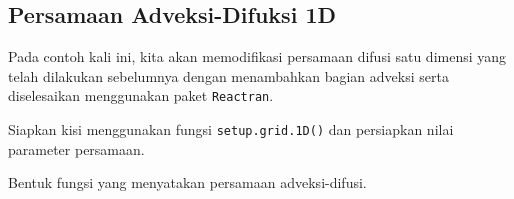 \documentclass[
]{book}
\newenvironment{Shaded}{\begin{snugshade}}{\end{snugshade}}
\newcommand{\AttributeTok}[1]{\textcolor[rgb]{0.13,0.29,0.53}{#1}}
\newcommand{\CommentTok}[1]{\textcolor[rgb]{0.56,0.35,0.01}{\textit{#1}}}
\newcommand{\ControlFlowTok}[1]{\textcolor[rgb]{0.13,0.29,0.53}{\textbf{#1}}}
\newcommand{\DecValTok}[1]{\textcolor[rgb]{0.00,0.00,0.81}{#1}}
\newcommand{\FloatTok}[1]{\textcolor[rgb]{0.00,0.00,0.81}{#1}}
\newcommand{\FunctionTok}[1]{\textcolor[rgb]{0.13,0.29,0.53}{\textbf{#1}}}
\newcommand{\NormalTok}[1]{#1}
\newcommand{\OtherTok}[1]{\textcolor[rgb]{0.56,0.35,0.01}{#1}}
\newcommand{\SpecialCharTok}[1]{\textcolor[rgb]{0.81,0.36,0.00}{\textbf{#1}}}
\theoremstyle{definition}
\theoremstyle{definition}
\theoremstyle{definition}
\theoremstyle{definition}
\theoremstyle{remark}
\begin{document}
\hypertarget{persamaan-adveksi-difuksi-1d}{%
\subsection{Persamaan Adveksi-Difuksi 1D}\label{persamaan-adveksi-difuksi-1d}}

Pada contoh kali ini, kita akan memodifikasi persamaan difusi satu dimensi yang telah dilakukan sebelumnya dengan menambahkan bagian adveksi serta diselesaikan menggunakan paket \texttt{Reactran}.

Siapkan kisi menggunakan fungsi \texttt{setup.grid.1D()} dan persiapkan nilai parameter persamaan.

\begin{Shaded}
\end{Shaded}

Bentuk fungsi yang menyatakan persamaan adveksi-difusi.

\begin{Shaded}
\end{Shaded}
\end{document}
